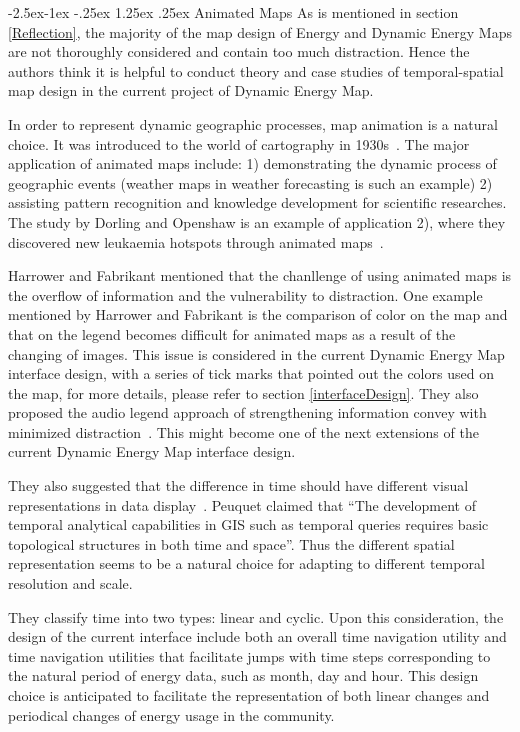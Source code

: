 \documentclass[hidelinks,12pt]{article}
\makeatletter
\renewcommand\paragraph{\@startsection{paragraph}{4}{\z@}%
            {-2.5ex\@plus -1ex \@minus -.25ex}%
            {1.25ex \@plus .25ex}%
            {\normalfont\normalsize\bfseries}}
\makeatother
\begin{document}
\paragraph{Animated Maps}\label{anime}
As is mentioned in section \ref{Reflection}, the majority of the map
design of Energy and Dynamic Energy Maps are not thoroughly considered
and contain too much distraction. Hence the authors think it is
helpful to conduct theory and case studies of temporal-spatial map
design in the current project of Dynamic Energy Map.

In order to represent dynamic geographic processes, map animation is a
natural choice. It was introduced to the world of cartography in
1930s~\cite{Harrower2008}. The major application of animated maps
include: 1) demonstrating the dynamic process of geographic events
(weather maps in weather forecasting is such an example) 2) assisting
pattern recognition and knowledge development for scientific
researches. The study by Dorling and Openshaw is an example of 
application 2), where they discovered new leukaemia hotspots through
animated maps~\cite{Dorling1992}.

Harrower and Fabrikant mentioned that the chanllenge of using animated
maps is the overflow of information and the vulnerability to
distraction. One example mentioned by Harrower and Fabrikant is the
comparison of color on the map and that on the legend becomes
difficult for animated maps as a result of the changing of
images. This issue is considered in the current Dynamic Energy Map
interface design, with a series of tick marks that pointed out the
colors used on the map, for more details, please refer to section
\ref{interfaceDesign}.  They also proposed the audio legend approach of
strengthening information convey with minimized
distraction~\cite{Harrower2008}. This might become one of the next
extensions of the current Dynamic Energy Map interface design.

They also suggested that the difference in time should have different
visual representations in data display~\cite{Harrower2008}. Peuquet
claimed that ``The development of temporal analytical capabilities in
GIS such as temporal queries requires basic topological structures in
both time and space''. Thus the different spatial representation seems
to be a natural choice for adapting to different temporal resolution
and scale. 

They classify time into two types: linear and cyclic. Upon this
consideration, the design of the current interface include both an
overall time navigation utility and time navigation utilities that
facilitate jumps with time steps corresponding to the natural period
of energy data, such as month, day and hour. This design choice
is anticipated to facilitate the representation of both linear changes
and periodical changes of energy usage in the community.
\end{document}
